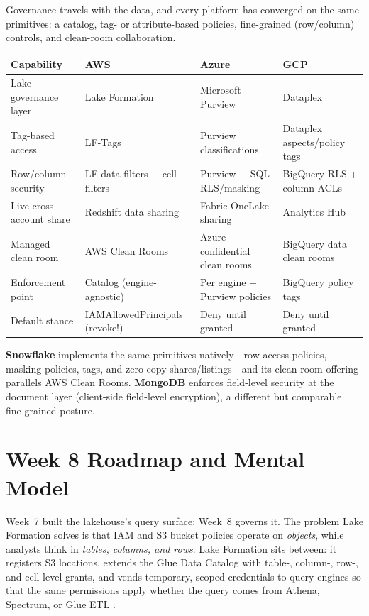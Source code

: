 \begin{crosscloud}
Governance travels with the data, and every platform has converged on the same primitives: a catalog, tag- or attribute-based policies, fine-grained (row/column) controls, and clean-room collaboration.

\vspace{2mm}
{\footnotesize
\begin{tabular}{@{}p{2.8cm}p{3.0cm}p{3.0cm}p{3.0cm}@{}}
\toprule
\textbf{Capability} & \textbf{AWS} & \textbf{Azure} & \textbf{GCP} \\
\midrule
Lake governance layer & Lake Formation & Microsoft Purview & Dataplex \\
Tag-based access & LF-Tags & Purview classifications & Dataplex aspects/policy tags \\
Row/column security & LF data filters + cell filters & Purview + SQL RLS/masking & BigQuery RLS + column ACLs \\
Live cross-account share & Redshift data sharing & Fabric OneLake sharing & Analytics Hub \\
Managed clean room & AWS Clean Rooms & Azure confidential clean rooms & BigQuery data clean rooms \\
\addlinespace
Enforcement point & Catalog (engine-agnostic) & Per engine + Purview policies & BigQuery policy tags \\
Default stance & IAMAllowedPrincipals (revoke!) & Deny until granted & Deny until granted \\
\bottomrule
\end{tabular}}

\vspace{1mm}
\textbf{Snowflake} implements the same primitives natively---row access policies, masking policies, tags, and zero-copy shares/listings---and its clean-room offering parallels AWS Clean Rooms. \textbf{MongoDB} enforces field-level security at the document layer (client-side field-level encryption), a different but comparable fine-grained posture.
\end{crosscloud}

\section{Week 8 Roadmap and Mental Model}
Week~7 built the lakehouse's query surface; Week~8 governs it. The problem Lake Formation solves is that IAM and S3 bucket policies operate on \emph{objects}, while analysts think in \emph{tables, columns, and rows}. Lake Formation sits between: it registers S3 locations, extends the Glue Data Catalog with table-, column-, row-, and cell-level grants, and vends temporary, scoped credentials to query engines so that the same permissions apply whether the query comes from Athena, Spectrum, or Glue ETL \cite{awsLakeFormationDocs}.

